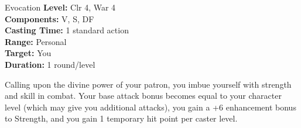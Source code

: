 {Evocation}
{
	\textbf{Level:}
	Clr 4, War 4\\
	\textbf{Components:}
	V, S, DF\\
	\textbf{Casting Time:}
	1 standard action\\
	\textbf{Range:}
	Personal\\
	\textbf{Target:}
	You\\
	\textbf{Duration:}
	1 round/level\\
}
{
	Calling upon the divine power of your patron, you imbue yourself with strength and skill in combat. Your base attack bonus becomes equal to your character level (which may give you additional attacks), you gain a +6 enhancement bonus to Strength, and you gain 1 temporary hit point per caster level.

}
